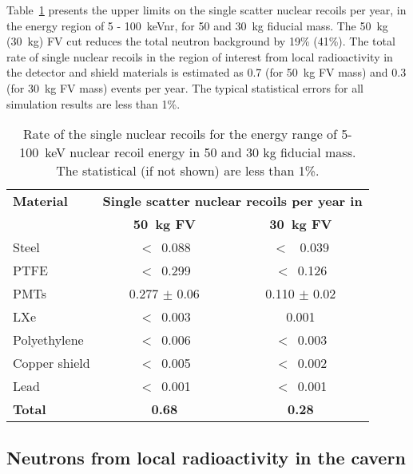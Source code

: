 Table~\ref{tab:nrates} presents the upper limits on the single scatter nuclear recoils
per year, in the energy region of 5 - 100~keVnr, for 50 and 30~kg fiducial mass. 
The 50~kg (30~kg) FV cut reduces the total neutron background by 19\% (41\%).
The total rate of single nuclear recoils in the region of interest from local radioactivity in the
detector and shield materials is estimated  as 0.7 (for 50~kg FV mass) and
0.3 (for 30~kg FV mass) events per year.
The typical statistical errors for all simulation results are less than 1\%.

\begin{table}[h!]
\centering
\caption{Rate of the single nuclear recoils for the energy range of 5-100~keV nuclear recoil energy in 
50 and 30 kg fiducial mass. The statistical (if not shown) are less than 1\%.}
\label{tab:nrates}
\vspace{0.3cm}
\begin{tabular}{lcc}
\hline
\bf{Material} &  \multicolumn{2}{c}{\bf{Single scatter nuclear recoils per year in}}\\
           & \bf{50~kg FV}  & \bf{ 30~kg FV} \\
\hline
Steel & $<$~0.088 & $<$~ 0.039  \\
PTFE  & $<$~0.299 & $<$~0.126 \\
PMTs  & 0.277 $\pm$ 0.06 &  0.110 $\pm$ 0.02 \\
LXe   &  $<$~0.003  &0.001    \\
Polyethylene  & $<$~0.006   & $<$~0.003\\
Copper shield & $<$~0.005   & $<$~0.002  \\
Lead  & $<$~0.001  & $<$~0.001  \\
\hline
\bf{Total}  &\bf{0.68}   &\bf{0.28} \\
\hline
\end{tabular}
\end{table}

\subsection {Neutrons from local radioactivity in the cavern} \label{sec:rock}


